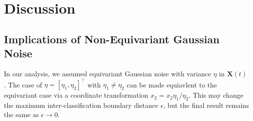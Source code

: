 \documentclass[12pt]{article}
\begin{document}
\section{Discussion}

\subsection{Implications of Non-Equivariant Gaussian Noise}
In our analysis, we assumed equivariant Gaussian noise with variance $\eta$ in
$\mathbf X(t)$. 
The case of $\eta = [\eta_1, \eta_2]^\top$ with $\eta_1\neq\eta_2$ can be made
equiavlent to the equivariant case via a coordinate transformation $x_2 = x_2
\eta_1 / \eta_2$. 
This may change the maximum inter-classification boundary distance $\epsilon$, 
but the final result remains the same as $\epsilon \to 0$. 
\end{document}
